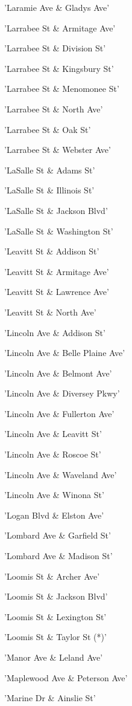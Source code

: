 \documentclass[11pt]{article}
\begin{document}
\begin{enumerate*}
\item 'Laramie Ave \& Gladys Ave'
\item 'Larrabee St \& Armitage Ave'
\item 'Larrabee St \& Division St'
\item 'Larrabee St \& Kingsbury St'
\item 'Larrabee St \& Menomonee St'
\item 'Larrabee St \& North Ave'
\item 'Larrabee St \& Oak St'
\item 'Larrabee St \& Webster Ave'
\item 'LaSalle St \& Adams St'
\item 'LaSalle St \& Illinois St'
\item 'LaSalle St \& Jackson Blvd'
\item 'LaSalle St \& Washington St'
\item 'Leavitt St \& Addison St'
\item 'Leavitt St \& Armitage Ave'
\item 'Leavitt St \& Lawrence Ave'
\item 'Leavitt St \& North Ave'
\item 'Lincoln Ave \& Addison St'
\item 'Lincoln Ave \& Belle Plaine Ave'
\item 'Lincoln Ave \& Belmont Ave'
\item 'Lincoln Ave \& Diversey Pkwy'
\item 'Lincoln Ave \& Fullerton Ave'
\item 'Lincoln Ave \& Leavitt St'
\item 'Lincoln Ave \& Roscoe St'
\item 'Lincoln Ave \& Waveland Ave'
\item 'Lincoln Ave \& Winona St'
\item 'Logan Blvd \& Elston Ave'
\item 'Lombard Ave \& Garfield St'
\item 'Lombard Ave \& Madison St'
\item 'Loomis St \& Archer Ave'
\item 'Loomis St \& Jackson Blvd'
\item 'Loomis St \& Lexington St'
\item 'Loomis St \& Taylor St (*)'
\item 'Manor Ave \& Leland Ave'
\item 'Maplewood Ave \& Peterson Ave'
\item 'Marine Dr \& Ainslie St'

\end{enumerate*}
\end{document}
